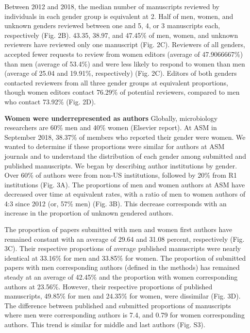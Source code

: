 \documentclass[11pt,]{article}
\begin{document}
Between 2012 and 2018, the median number of manuscripts reviewed by
individuals in each gender group is equivalent at 2. Half of men, women,
and unknown genders reviewed between one and 5, 4, or 3 manuscripts
each, respectively (Fig. 2B). 43.35, 38.97, and 47.45\% of men, women,
and unknown reviewers have reviewed only one manuscript (Fig. 2C).
Reviewers of all genders, accepted fewer requests to review from women
editors (average of 47.9066667\%) than men (average of 53.4\%) and were
less likely to respond to women than men (average of 25.04 and 19.91\%,
respectively) (Fig. 2C). Editors of both genders contacted reviewers
from all three gender groups at equivalent proportions, though women
editors contact 76.29\% of potential reviewers, compared to men who
contact 73.92\% (Fig. 2D).

\textbf{Women were underrepresented as authors} Globally, microbiology
researchers are 60\% men and 40\% women (Elsevier report). At ASM in
September 2018, 38.37\% of members who reported their gender were women.
We wanted to determine if these proportions were similar for authors at
ASM journals and to understand the distribution of each gender among
submitted and published manuscripts. We began by describing author
institutions by gender. Over 60\% of authors were from non-US
institutions, followed by 20\% from R1 institutions (Fig. 3A). The
proportions of men and women authors at ASM have decreased over time at
equivalent rates, with a ratio of men to women authors of 4:3 since 2012
(or, 57\% men) (Fig. 3B). This decrease corresponds with an increase in
the proportion of unknown gendered authors.

The proportion of papers submitted with men and women first authors have
remained constant with an average of 29.64 and 31.08 percent,
respectively (Fig. 3C). Their respective proportions of average
published manuscripts were nearly identical at 33.16\% for men and
33.85\% for women. The proportion of submitted papers with men
corresponding authors (defined in the methods) has remained steady at an
average of 42.45\% and the proportion with women corresponding authors
at 23.56\%. However, their respective proportions of published
manuscripts, 49.85\% for men and 24.35\% for women, were dissimilar
(Fig. 3D). The difference between published and submitted proportions of
manuscripts where men were corresponding authors is 7.4, and 0.79 for
women corresponding authors. This trend is similar for middle and last
authors (Fig. S3).
\end{document}
